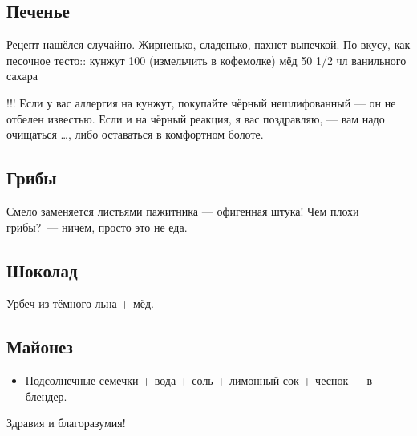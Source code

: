 \subsection{Печенье}

Рецепт нашёлся случайно. Жирненько, сладенько, пахнет выпечкой. По вкусу, как песочное тесто::
кунжут 100 (измельчить в кофемолке)
мёд 50
1/2 чл ванильного сахара

!!! Если у вас аллергия на кунжут, покупайте чёрный нешлифованный — он не отбелен известью. Если и на чёрный реакция, я вас поздравляю, — вам надо очищаться \ldots, либо оставаться в комфортном болоте.

\subsection{Грибы}

Смело заменяется листьями пажитника — офигенная штука! Чем плохи грибы?~--- ничем, просто это не еда.

\subsection{Шоколад}

Урбеч из тёмного льна + мёд.

\subsection{Майонез}
\begin{itemize}
\item Подсолнечные семечки + вода + соль + лимонный сок + чеснок — в блендер.
\end{itemize}

Здравия и благоразумия!

